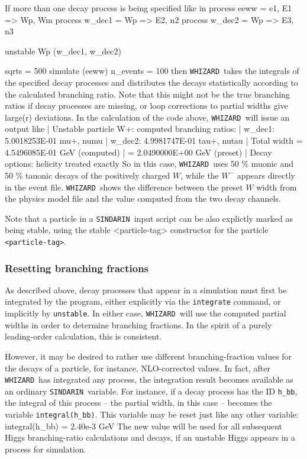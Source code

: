 \documentclass[12pt]{book}
\newenvironment{code}%
  {\begingroup\footnotesize
   \quote
   \Verbatim}%
  {\endVerbatim
   \endquote
   \endgroup\noindent}
\newcommand{\ttt}[1]{\texttt{#1}}
\newcommand{\whizard}{\ttt{WHIZARD}}
\newcommand{\sindarin}{\ttt{SINDARIN}}
\begin{document}
If more than one decay process is being specified like in
\begin{code}
  process eeww = e1, E1 => Wp, Wm
  process w_dec1 = Wp => E2, n2
  process w_dec2 = Wp => E3, n3

  unstable Wp (w_dec1, w_dec2)

  sqrts = 500
  simulate (eeww) { n_events = 100 }
\end{code}
then \whizard\ takes the integrals of the specified decay processes
and distributes the decays statistically according to the calculated
branching ratio. Note that this might not be the true branching ratios
if decay processes are missing, or loop corrections to partial widths
give large(r) deviations. In the calculation of the code above,
\whizard\ will issue an output like
\begin{code}
| Unstable particle W+: computed branching ratios:
|   w_dec1: 5.0018253E-01   mu+, numu
|   w_dec2: 4.9981747E-01   tau+, nutau
|   Total width = 4.5496085E-01 GeV (computed)
|               = 2.0490000E+00 GeV (preset)
|   Decay options: helicity treated exactly
\end{code}
So in this case, \whizard\ uses 50 \% muonic and 50 \% tauonic decays
of the positively charged $W$, while the $W^-$ appears directly in the
event file. \whizard\ shows the difference between the preset $W$
width from the physics model file and the value computed from the two
decay channels.

Note that a particle in a \sindarin\ input script can be also explictly
marked as being stable, using the
\begin{code}
stable <particle-tag>
\end{code}
constructor for the particle \ttt{<particle-tag>}.


\subsubsection{Resetting branching fractions}
\label{sec:br-reset}

As described above, decay processes that appear in a simulation must
first be integrated by the program, either explicitly via the
\verb|integrate| command, or implicitly by \verb|unstable|.  In either
case, \whizard\ will use the computed partial widths in order to
determine branching fractions.  In the spirit of a purely leading-order
calculation, this is consistent.

However, it may be desired to rather use different branching-fraction
values for the decays of a particle, for instance, NLO-corrected
values.  In fact, after \whizard\ has integrated any process, the
integration result becomes available as an ordinary
\sindarin\ variable.  For instance, if a decay process has the ID
\verb|h_bb|, the integral of this process -- the partial width, in
this case -- becomes the variable \verb|integral(h_bb)|.  This
variable may be reset just like any other variable:
\begin{code}
  integral(h_bb) = 2.40e-3 GeV
\end{code}
The new value will be used for all subsequent Higgs branching-ratio
calculations and decays, if an unstable Higgs appears in a process for
simulation.
\end{document}
